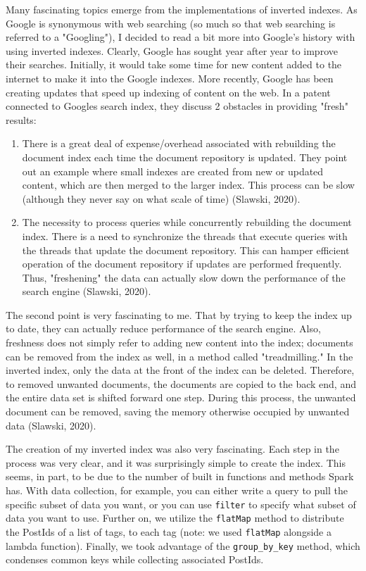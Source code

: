 \documentclass[]{article}
\newcommand{\code}[1]{\colorbox{light-gray}{\texttt{#1}}}
\begin{document}
Many fascinating topics emerge from the implementations of inverted indexes.  As Google is synonymous with web searching (so much so that web searching is referred to a "Googling"), I decided to read a bit more into Google's history with using inverted indexes.  Clearly, Google has sought year after year to improve their searches.  Initially, it would take some time for new content added to the internet to make it into the Google indexes.  More recently, Google has been creating updates that speed up indexing of content on the web.  In a patent connected to Googles search index, they discuss 2 obstacles in providing "fresh" results:
\begin{enumerate}
	\item There is a great deal of expense/overhead associated with rebuilding the document index each time the document repository is updated.  They point out an example where small indexes are created from new or updated content, which are then merged to the larger index.  This process can be slow (although they never say on what scale of time) (Slawski, 2020).
	\item The necessity to process queries while concurrently rebuilding the document index.  There is a need to synchronize the threads that execute queries with the threads that update the document repository.  This can hamper efficient operation of the document repository if updates are performed frequently.  Thus, "freshening" the data can actually slow down the performance of the search engine (Slawski, 2020).
\end{enumerate}
The second point is very fascinating to me.  That by trying to keep the index up to date, they can actually reduce performance of the search engine.  Also, freshness does not simply refer to adding new content into the index; documents can be removed from the index as well, in a method called "treadmilling."  In the inverted index, only the data at the front of the index can be deleted.  Therefore, to removed unwanted documents, the documents are copied to the back end, and the entire data set is shifted forward one step.  During this process, the unwanted document can be removed, saving the memory otherwise occupied by unwanted data (Slawski, 2020). 

The creation of my inverted index was also very fascinating.  Each step in the process was very clear, and it was surprisingly simple to create the index.  This seems, in part, to be due to the number of built in functions and methods Spark has.  With data collection, for example, you can either write a query to pull the specific subset of data you want, or you can use \code{filter} to specify what subset of data you want to use.  Further on, we utilize the \code{flatMap} method to distribute the PostIds of a list of tags, to each tag (note: we used \code{flatMap} alongside a lambda function).  Finally, we took advantage of the \code{group\_by\_key} method, which condenses common keys while collecting associated PostIds.
\end{document}
